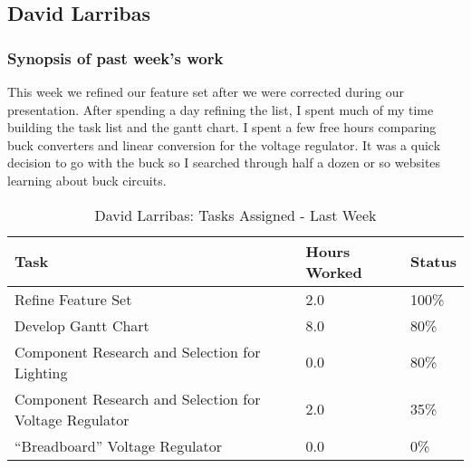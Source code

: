 \documentclass[12pt,compsoc]{IEEEtran}
\begin{document}
\subsection{David Larribas}

	\subsubsection*{Synopsis of past week's work}

	This week we refined our feature set after we were corrected during our presentation.  After spending 
	a day refining the list, I spent much of my time building the task list and the gantt chart.  I spent 
	a few free hours comparing buck converters and linear conversion for the voltage regulator. It was a 
	quick decision to go with the buck so I searched through half a dozen or so websites learning about 
	buck circuits.

	\begin{table}[ht]
	\renewcommand{\arraystretch}{1.3}
		\caption{David Larribas: Tasks Assigned - Last Week}
		
		\label{Summary of David Larribas' activities: last week}
		
		\centering
		\begin{tabular}{p{5.5cm}|p{1cm}|p{1cm}}
		\hline
		\bfseries 	Task		 	                        				& \bfseries Hours Worked	& \bfseries Status	\\
		\hline\hline
					Refine Feature Set										&2.0 						&100\%				\\
					Develop Gantt Chart										&8.0 						&80\%				\\
					Component Research and Selection for Lighting			&0.0 						&80\%				\\
					Component Research and Selection for Voltage Regulator	&2.0 						&35\%				\\
					“Breadboard” Voltage Regulator							&0.0 						&0\%				\\
		\hline
		\end{tabular}
	\end{table}
\end{document}
